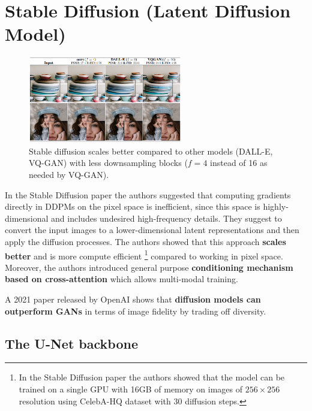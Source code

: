 \section{Stable Diffusion (Latent Diffusion Model)}
\label{sec:stable_diffusion}


\begin{figure}
    \centering
    \includegraphics[width=0.6\textwidth]{images/diffusion_models/stable_diffusion/stable_diffusion.png}
    \caption{Stable diffusion scales better compared to other models \cite{stable_diffusion} (DALL-E, VQ-GAN) with less downsampling blocks ($f = 4$ instead of 16 as needed by VQ-GAN).}
\end{figure}


In the Stable Diffusion paper \cite{stable_diffusion} the authors suggested that computing gradients directly in DDPMs on the pixel space is inefficient, since this space is highly-dimensional and includes undesired high-frequency details. They suggest to convert the input images to a lower-dimensional latent representations and then apply the diffusion processes. The authors showed that this approach \textbf{scales better} and is more compute efficient \footnote{In the Stable Diffusion paper \cite{stable_diffusion} the authors showed that the model can be trained on a single GPU with 16GB of memory on images of $256\times 256$ resolution using CelebA-HQ dataset with 30 diffusion steps.} compared to working in pixel space. Moreover, the authors introduced general purpose \textbf{conditioning mechanism based on cross-attention} which allows multi-modal training.

A 2021 paper released by OpenAI \cite{openai_diffusion_beats_gans} shows that \textbf{diffusion models can outperform GANs} in terms of image fidelity by trading off diversity.











\subsection{The U-Net backbone}
\label{subsec:stable_diffusion_u_net_backbone}

